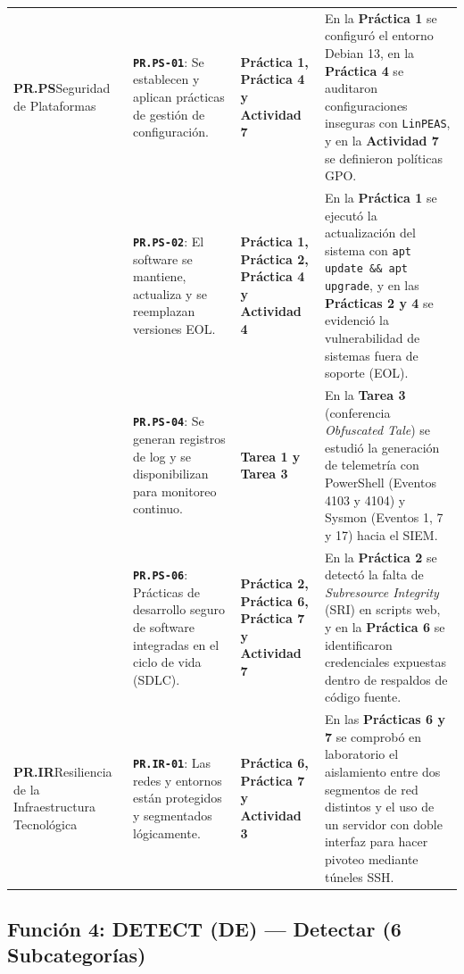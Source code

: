 \documentclass[letterpaper,11pt]{article}
\begin{document}
\begin{longtable}{|L{2.8cm}|L{4.5cm}|L{2.9cm}|L{6.5cm}|}
\textbf{PR.PS}\newline Seguridad de Plataformas &
\textbf{\texttt{PR.PS-01}}: Se establecen y aplican prácticas de gestión de configuración. &
\textbf{Práctica 1, Práctica 4 y Actividad 7} &
En la \textbf{Práctica 1} se configuró el entorno Debian 13, en la \textbf{Práctica 4} se auditaron configuraciones inseguras con \texttt{LinPEAS}, y en la \textbf{Actividad 7} se definieron políticas GPO. \\
\nopagebreak
 &
\textbf{\texttt{PR.PS-02}}: El software se mantiene, actualiza y se reemplazan versiones EOL. &
\textbf{Práctica 1, Práctica 2, Práctica 4 y Actividad 4} &
En la \textbf{Práctica 1} se ejecutó la actualización del sistema con \texttt{apt update \&\& apt upgrade}, y en las \textbf{Prácticas 2 y 4} se evidenció la vulnerabilidad de sistemas fuera de soporte (EOL). \\
\nopagebreak
 &
\textbf{\texttt{PR.PS-04}}: Se generan registros de log y se disponibilizan para monitoreo continuo. &
\textbf{Tarea 1 y Tarea 3} &
En la \textbf{Tarea 3} (conferencia \textit{Obfuscated Tale}) se estudió la generación de telemetría con PowerShell (Eventos 4103 y 4104) y Sysmon (Eventos 1, 7 y 17) hacia el SIEM. \\
\nopagebreak
 &
\textbf{\texttt{PR.PS-06}}: Prácticas de desarrollo seguro de software integradas en el ciclo de vida (SDLC). &
\textbf{Práctica 2, Práctica 6, Práctica 7 y Actividad 7} &
En la \textbf{Práctica 2} se detectó la falta de \textit{Subresource Integrity} (SRI) en scripts web, y en la \textbf{Práctica 6} se identificaron credenciales expuestas dentro de respaldos de código fuente. \\
\hline

\textbf{PR.IR}\newline Resiliencia de la Infraestructura Tecnológica &
\textbf{\texttt{PR.IR-01}}: Las redes y entornos están protegidos y segmentados lógicamente. &
\textbf{Práctica 6, Práctica 7 y Actividad 3} &
En las \textbf{Prácticas 6 y 7} se comprobó en laboratorio el aislamiento entre dos segmentos de red distintos y el uso de un servidor con doble interfaz para hacer pivoteo mediante túneles SSH. \\
\hline
\end{longtable}
\endgroup

\subsection{Función 4: DETECT (DE) --- Detectar (6 Subcategorías)}
\end{document}

